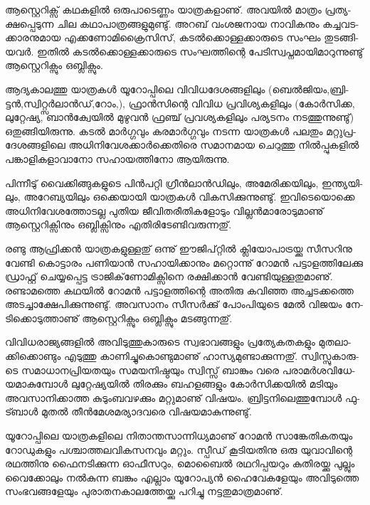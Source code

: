 ആ­സ്റ്റെ­റി­ക്സ് കഥ­ക­ളില്‍ ഒരു­പാ­ടെ­ണ്ണം യാ­ത്ര­ക­ളാ­ണു്. അവ­യില്‍ മാ­ത്രം പ്ര­ത്യ­ക്ഷ­പ്പെ­ടു­ന്ന ചില കഥാ­പാ­ത്ര­ങ്ങ­ളു­മു­ണ്ടു്. 
അറ­ബ് വം­ശ­ജ­നായ നാ­വി­ക­നും കച്ച­വ­ട­ക്കാ­ര­നു­മായ എക്ക­ണോ­മി­ക്രൈ­സി­സ്, കടല്‍­ക്കൊ­ള്ള­ക്കാ­രു­ടെ സം­ഘം 
തു­ട­ങ്ങി­യ­വര്‍. ഇതില്‍ കടല്‍­ക്കൊ­ള്ള­ക്കാ­രു­ടെ സം­ഘ­ത്തി­ന്റെ പേ­ടി­സ്വ­പ്ന­മാ­യി­മാ­റു­ന്നു­ണ്ടു് ആസ്റ്റെ­റി­ക്സും ഒബ്ലി­ക്സും­.

ആ­ദ്യ­കാ­ല­ത്തു യാ­ത്ര­കള്‍ യൂ­റോ­പ്പി­ലെ വി­വി­ധ­ദേ­ശ­ങ്ങ­ളി­ലും (ബെല്‍­ജി­യം­,­ബ്രി­ട്ടന്‍,­സ്വി­റ്റ്സര്‍­ലാന്‍­ഡ്,­റോം­,), ഫ്രാന്‍­സി­ന്റെ 
വി­വിധ പ്ര­വി­ശ്യ­ക­ളി­ലും (കോര്‍­സി­ക്ക, ലു­റ്റേ­ഷ്യ, ബാന്‍­ക്വേ­യില്‍ മു­ഴു­വന്‍ ഫ്ര­ഞ്ച് പ്ര­വ­ശ്യ­ക­ളി­ലും പര്യ­ട­നം നട­ത്തു­ന്നു­ണ്ടു്) 
ഒതു­ങ്ങി­യി­രു­ന്നു. കടല്‍ മാര്‍­ഗ്ഗ­വും കര­മാര്‍­ഗ്ഗ­വും നട­ന്ന യാ­ത്ര­കള്‍ പല­തും മറ്റു­പ്ര­ദേ­ശ­ങ്ങ­ളി­ലെ 
അധി­നി­വേ­ശ­ക്കാര്‍­ക്കെ­തി­രെ സമാ­ന­മായ ചെ­റു­ത്തു നില്‍­പ്പു­ക­ളില്‍ പങ്കാ­ളി­ക­ളാ­വാ­നോ സഹാ­യ­ത്തി­നോ ആയി­രു­ന്നു­.

­പി­ന്നീ­ടു് വൈ­ക്കി­ങ്ങു­ക­ളു­ടെ പിന്‍­പ­റ്റി ഗ്രീന്‍­ലാന്‍­ഡി­ലും, അമേ­രി­ക്ക­യി­ലും, ഇന്ത്യ­യി­ലും, അറേ­ബ്യ­യി­ലും ഒക്കെ­യാ­യി യാ­ത്ര­കള്‍ വി­ക­സി­ക്കു­ന്നു­ണ്ടു്. ഇവി­ടെ­യൊ­ക്കെ അധി­നി­വേ­ശ­ത്തോ­ട­ല്ല പു­തിയ ജീ­വി­ത­രീ­തി­ക­ളോ­ടും വി­ല്ലന്‍­മാ­രോ­ടു­മാ­ണു് 
ആസ്റ്റെ­റി­ക്സി­നും ഒബ്ലി­ക്സി­നും എതി­രി­ടേ­ണ്ടി­വ­രു­ന്ന­തു്.

­ര­ണ്ടു ആഫ്രി­ക്കന്‍ യാ­ത്ര­ക­ളു­ള്ള­തു് ഒന്നു് ഈജി­പ്റ്റില്‍ ക്ലി­യോ­പാ­ട്ര­യ്ക്കു സീ­സ­റി­നു വേ­ണ്ടി കൊ­ട്ടാ­രം പണി­യാന്‍ 
സഹാ­യി­ക്കാ­നും മറ്റൊ­ന്നു് റോ­മന്‍ പട്ടാ­ള­ത്തി­ലേ­ക്കു ഡ്രാ­ഫ്റ്റ് ചെ­യ്യ­പ്പെ­ട്ട ട്രാ­ജി­ക്‌­ണോ­മി­ക്സി­നെ രക്ഷി­ക്കാന്‍ 
വേ­ണ്ടി­യു­ള്ള­തു­മാ­ണു്. രണ്ടാ­മ­ത്തെ കഥ­യില്‍ റോ­മന്‍ പട്ടാ­ള­ത്തി­ന്റെ അതി­രു കവി­ഞ്ഞ അച്ച­ട­ക്ക­ത്തെ 
അട­ച്ചാ­ക്ഷേ­പി­ക്കു­ന്നു­ണ്ടു്. അവ­സാ­നം സീ­സര്‍­ക്കു് പോം­പി­യു­ടെ മേല്‍ വി­ജ­യം നേ­ടി­ക്കൊ­ടു­ത്താ­ണു് ആസ്റ്റെ­റി­ക്സും ഒബ്ലി­ക്സും 
മട­ങ്ങു­ന്ന­തു്.

­വി­വി­ധ­രാ­ജ്യ­ങ്ങ­ളില്‍ അവി­ടു­ത്തു­കാ­രു­ടെ സ്വ­ഭാ­വ­ങ്ങ­ളും പ്ര­ത്യേ­ക­ത­ക­ളും മു­ത­ലാ­ക്കി­ക്കൊ­ണ്ടും എടു­ത്തു 
കാ­ണി­ച്ചു­കൊ­ണ്ടു­മാ­ണു് ഹാ­സ്യ­മു­ണ്ടാ­ക്കു­ന്ന­തു്. സ്വി­സ്സു­കാ­രു­ടെ സമാ­ധാ­ന­പ്രി­യ­ത­യും സമ­യ­നി­ഷ്ഠ­യും സ്വി­സ്സ് ബാ­ങ്കും 
വരെ പരാ­മര്‍­ശ­വി­ധേ­യ­മാ­കു­മ്പോള്‍ ലു­റ്റേ­ഷ്യ­യില്‍ തി­ര­ക്കും ബഹ­ള­ങ്ങ­ളും കോര്‍­സി­ക്ക­യില്‍ മടി­യും അവ­സാ­നി­ക്കാ­ത്ത 
കു­ടും­ബ­വ­ഴ­ക്കും മറ്റു­മാ­ണു് വി­ഷ­യം. ബ്രി­ട്ട­നി­ലെ­ത്തു­മ്പോള്‍ ഫു­ട്ബാള്‍ മു­തല്‍ തീന്‍­മേ­ശ­മ­ര്യാ­ദ­വ­രെ വി­ഷ­യ­മാ­കു­ന്നു­ണ്ടു്.

­യൂ­റോ­പ്പി­ലെ യാ­ത്ര­ക­ളി­ലെ നി­താ­ന്ത­സാ­ന്നി­ധ്യ­മാ­ണു് റോ­മന്‍ സാ­ങ്കേ­തി­ക­ത­യും റോ­ഡു­ക­ളും പശ്ചാ­ത്ത­ല­വി­ക­സ­ന­വും മറ്റും. 
സ്പീ­ഡ് കൂ­ടി­യ­തി­നു ഒരു യു­വാ­വി­ന്റെ രഥ­ത്തി­നു ഫൈ­ന­ടി­ക്കു­ന്ന ഓഫീ­സ­റും, മൊ­ബൈല്‍ രഥ­റി­പ്പ­യ­റും കു­തി­ര­യ്ക്കു പു­ല്ലും 
വൈ­ക്കോ­ലും നല്‍­കു­ന്ന ബങ്കും എല്ലാം യൂ­റോ­പ്യന്‍ ഹൈ­വേ­ക­ളേ­യും അവി­ടു­ത്തെ സം­ഭ­വ­ങ്ങ­ളേ­യും പു­രാ­ത­ന­കാ­ല­ത്തേ­യ്ക്കു 
പറി­ച്ചു നട്ട­തു­മാ­ത്ര­മാ­ണു്.


